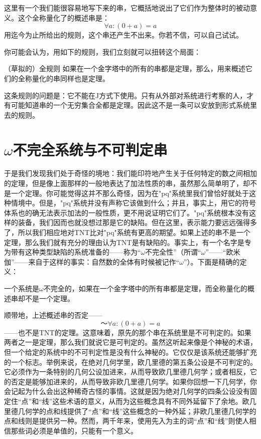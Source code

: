这里有一个我们能很容易地写下来的串，它概括地说出了它们作为整体时的被动意义。这个全称量化了的概述串是：
\[
\forall a:(0+a)=a
\]
用迄今为止所给出的规则，这个串还产生不出来。你若不信，可以自己试试。

你可能会认为，用如下的规则，我们立刻就可以扭转这个局面：

\begin{thm}[\parindent]{（草拟的）全规则}
如果在一个金字塔中的所有的串都是定理，那么，用来概述它们的全称量化的串同样也是定理。
\end{thm}

这条规则的问题是：它不能在J方式下使用。只有从外部对系统进行考察的人，才有可能知道串的一个无穷集合全都是定理。因此这不是一条可以安放到形式系统里去的规则。

\section{\texorpdfstring{$\omega$}{\textomega}不完全系统与不可判定串}

于是我们发现我们处于奇怪的境地：我们能印符地产生关于任何特定的数之间相加的定理，但是像上面那样的一般地表达了加法性质的串，虽然那么简单明了，却不是一个定理。你可能觉得这并不那么奇怪，因为在"pq"系统里我们曾恰好就处于这种情境中。但是，"pq"系统并没有声称它该做到什么；并且，事实上，用它的符号体系也的确无法表示加法的一般性质，更不用说证明它们了。"pq"系统根本没有这样的装备，我们因而也就没想过那是它的缺陷。但在这里，表示能力要远远强得多了，所以我们相应地对TNT比对"pq"系统有更高的期望。如果上述的串不是一个定理，那么我们就有充分的理由认为TNT是有缺陷的。事实上，有一个名字是专为带有这种类型缺陷的系统准备的——称为“$\omega$不完全性”（所谓“$\omega$”——“欧米伽”——来自于这样的事实：自然数的全体有时候被记作“$\omega$”）。下面是精确的定义：

\begin{block}
一个系统是$\omega$不完全的，如果在一个金字塔中的所有串都是定理，而全称量化的概述串却不是一个定理。
\end{block}

顺带地，上述概述串的否定——
\[
～\forall a:(0+a)=a
\]
——也不是TNT的定理。这意味着，原先的那个串在系统里是不可判定的。如果两者之一是定理，那么我们就说它是可判定的。虽然这听起来像是个神秘的术语，但一个给定的系统中的不可判定性是没有什么神秘的。它仅仅是该系统还能够扩充的一个标志。举例来说，在绝对几何学里，欧几里德的第五条公设是不可判定的。它必须作为一条特别的几何公设加进来，从而导致欧几里德几何学；或者相反，它的否定是能够加进来的，从而导致非欧几里德几何学。如果你回想一下几何学，你会记起为什么会出这种稀奇古怪的事情。这就是因为绝对几何学的四条公设没有固定住“点”和“线”这些术语的意义，从而为这些概念具有不同外延留下了余地。欧几里德几何学的点和线提供了“点”和“线”这些概念的一种外延；非欧几里德几何学的点和线则是提供另一种。然而，两千年来，使用先入为主的词“点”和“线”则使人相信那些词必须是单值的，只能有一个意义。

